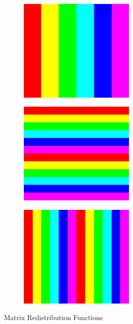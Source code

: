 \begin{figure}[ht]
\begin{subfigure}[b]{0.3\textwidth}
                \caption{}
        \end{subfigure}
\\[.3cm]
        \begin{subfigure}[b]{0.3\textwidth}
\includegraphics[height=5cm,width=\textwidth]{pbdDEMO-include/pics/colblock}
                \caption{}
        \end{subfigure}
        \hspace{.1cm}
        \begin{subfigure}[b]{0.3\textwidth}
\includegraphics[height=5cm,width=\textwidth]{pbdDEMO-include/pics/rowcyclic}
                \caption{}
        \end{subfigure}
        \hspace{.1cm}
        \begin{subfigure}[b]{0.3\textwidth}
\includegraphics[height=5cm,width=\textwidth]{pbdDEMO-include/pics/colcyclic}
                \caption{}
        \end{subfigure}
        
        \caption{Matrix Redistribution Functions}
        \label{fig:redistplots}
\end{figure}

